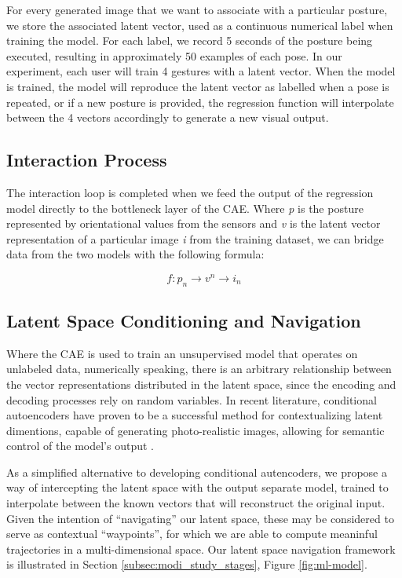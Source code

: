 For every generated image that we want to associate with a particular posture, we store the associated latent vector, used as a continuous numerical label when training the model. For each label, we record 5 seconds of the posture being executed, resulting in approximately 50 examples of each pose. In our experiment, each user will train 4 gestures with a latent vector. When the model is trained, the model will reproduce the latent vector as labelled when a pose is repeated, or if a new posture is provided, the regression function will interpolate between the 4 vectors accordingly to generate a new visual output.

\subsection*{Interaction Process}

The interaction loop is completed when we feed the output of the regression model directly to the bottleneck layer of the CAE. Where \textit{p} is the posture represented by orientational values from the sensors and \textit{v} is the latent vector representation of a particular image \textit{i} from the training dataset, we can bridge data from the two models with the following formula:

\[ f:p_n\xrightarrow{}v^n \xrightarrow{}i_n \]

\subsection*{Latent Space Conditioning and Navigation}

Where the CAE is used to train an unsupervised model that operates on unlabeled data, numerically speaking, there is an arbitrary relationship between the vector representations distributed in the latent space, since the encoding and decoding processes rely on random variables. In recent literature, conditional autoencoders have proven to be a successful method for contextualizing latent dimentions, capable of generating photo-realistic images, allowing for semantic control of the model's output \cite{zhang_age_2017}.

As a simplified alternative to developing conditional autencoders, we propose a way of intercepting the latent space with the output separate model, trained to interpolate between the known vectors that will reconstruct the original input. Given the intention of ``navigating'' our latent space, these may be considered to serve as contextual ``waypoints'', for which we are able to compute meaninful trajectories in a multi-dimensional space. Our latent space navigation framework is illustrated in Section \ref{subsec:modi_study_stages}, Figure \ref{fig:ml-model}.

